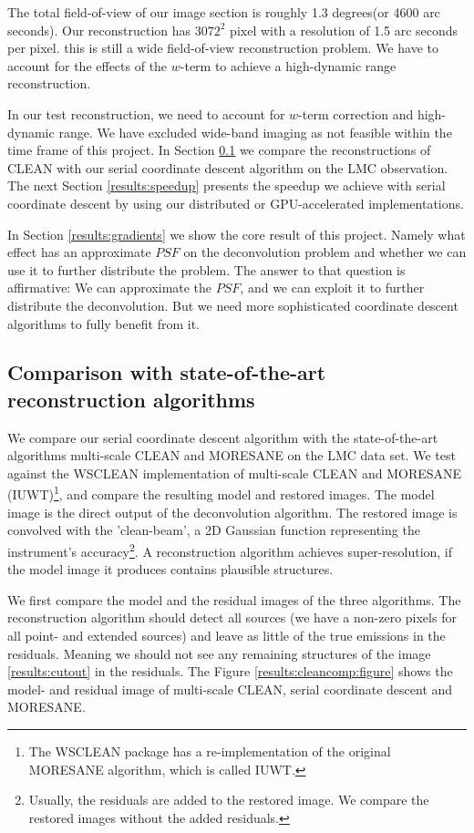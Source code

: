 The total field-of-view of our image section is roughly 1.3 degrees(or 4600 arc seconds). Our reconstruction has $3072^2$ pixel with a resolution of 1.5 arc seconds per pixel. this is still a wide field-of-view reconstruction problem. We have to account for the effects of the $w$-term to achieve a high-dynamic range reconstruction.

In our test reconstruction, we need to account for $w$-term correction and high-dynamic range. We have excluded wide-band imaging as not feasible within the time frame of this project. In Section \ref{results:cleancomp} we compare the reconstructions of CLEAN with our serial coordinate descent algorithm on the LMC observation. The next Section \ref{results:speedup} presents the speedup we achieve with serial coordinate descent by using our distributed or GPU-accelerated implementations.

In Section \ref{results:gradients} we show the core result of this project. Namely what effect has an approximate $PSF$ on the deconvolution problem and whether we can use it to further distribute the problem. The answer to that question is affirmative: We can approximate the $PSF$, and we can exploit it to further distribute the deconvolution. But we need more sophisticated coordinate descent algorithms to fully benefit from it.


\subsection{Comparison with state-of-the-art reconstruction algorithms} \label{results:cleancomp}
We compare our serial coordinate descent algorithm with the state-of-the-art algorithms multi-scale CLEAN and MORESANE on the LMC data set. We test against the WSCLEAN \cite{offringa2014wsclean} implementation of multi-scale CLEAN and MORESANE (IUWT)\footnote{The WSCLEAN package has a re-implementation of the original MORESANE algorithm\cite{dabbech2015moresane}, which is called IUWT.}, and compare the resulting model and restored images. The model image is the direct output of the deconvolution algorithm. The restored image is convolved with the 'clean-beam', a 2D Gaussian function representing the instrument's accuracy\footnote{Usually, the residuals are added to the restored image. We compare the restored images without the added residuals.}. A reconstruction algorithm achieves super-resolution, if the model image it produces contains plausible structures.

We first compare the model and the residual images of the three algorithms. The reconstruction algorithm should detect all sources (we have a non-zero pixels for all point- and extended sources) and leave as little of the true emissions in the residuals. Meaning we should not see any remaining structures of the image \ref{results:cutout} in the residuals. The Figure \ref{results:cleancomp:figure} shows the model- and residual image of multi-scale CLEAN, serial coordinate descent and MORESANE.


